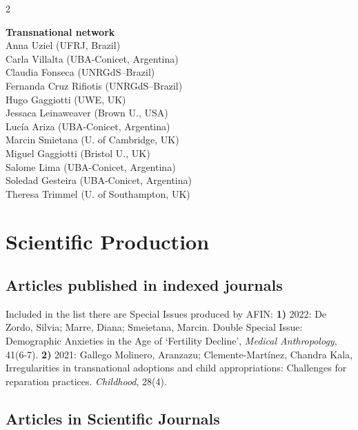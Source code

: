 \documentclass[english,a4paper,12pt,titlepage]{report}
\begin{document}
\begin{center}
\begin{multicols}{2}
\vspace{0.3cm}

	\textbf{Transnational network} \\
\vspace{0.2cm}	
Anna Uziel (UFRJ, Brazil) \\
Carla Villalta (UBA-Conicet, Argentina) \\
Claudia Fonseca (UNRGdS–Brazil) \\
Fernanda Cruz Rifiotis (UNRGdS–Brazil) \\
Hugo Gaggiotti (UWE, UK) \\
Jessaca Leinaweaver (Brown U., USA) \\
Lucía Ariza (UBA-Conicet, Argentina)\\
Marcin Smietana (U. of Cambridge, UK) \\
Miguel Gaggiotti (Bristol U., UK) \\
Salome Lima (UBA-Conicet, Argentina) \\
Soledad Gesteira (UBA-Conicet, Argentina)\\
Theresa Trimmel (U. of Southampton, UK) \\

	
	\end{multicols}
\end{center}


  \chapter{Scientific Production}

  \section{Articles published in indexed journals}
  
  Included in the list there are Special Issues produced by AFIN: \textbf{1)} 2022: De Zordo, Silvia; Marre, Diana; Smeietana, Marcin. Double Special Issue: Demographic Anxieties in the Age of ‘Fertility Decline’, \textit{Medical Anthropology}, 41(6-7). \textbf{2)} 2021: Gallego Molinero, Aranzazu; Clemente-Martínez, Chandra Kala, Irregularities in transnational adoptions and child appropriations: Challenges for reparation practices. \textit{Childhood}, 28(4).
  
  	
  \section{Articles in Scientific Journals}
  	
\end{document}
